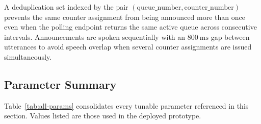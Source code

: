 A deduplication set indexed by the pair
$(\text{queue\_number}, \text{counter\_number})$ prevents the same
counter assignment from being announced more than once even when the
polling endpoint returns the same active queue across consecutive
intervals. Announcements are spoken sequentially with an $800\ \mathrm{ms}$
gap between utterances to avoid speech overlap when several counter
assignments are issued simultaneously.

\subsection{Parameter Summary}
\label{subsec:params}

Table~\ref{tab:all-params} consolidates every tunable parameter
referenced in this section. Values listed are those used in the
deployed prototype.


